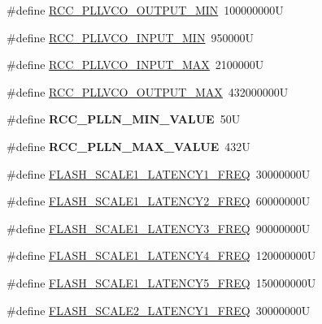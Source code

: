 \begin{DoxyCompactItemize}
\item 
\#define \mbox{\hyperlink{group___exported__macros_ga85746dffdc6d015f5142d7e16489ca84}{R\+C\+C\+\_\+\+P\+L\+L\+V\+C\+O\+\_\+\+O\+U\+T\+P\+U\+T\+\_\+\+M\+IN}}~100000000U
\item 
\#define \mbox{\hyperlink{group___exported__macros_ga288d68c2604cea8548eccdef3873923f}{R\+C\+C\+\_\+\+P\+L\+L\+V\+C\+O\+\_\+\+I\+N\+P\+U\+T\+\_\+\+M\+IN}}~950000U
\item 
\#define \mbox{\hyperlink{group___exported__macros_gad3fd37dbfa74739a3c698ab4755fa27e}{R\+C\+C\+\_\+\+P\+L\+L\+V\+C\+O\+\_\+\+I\+N\+P\+U\+T\+\_\+\+M\+AX}}~2100000U
\item 
\#define \mbox{\hyperlink{group___exported__macros_gaba6ddae0375763847f8dc3e91173d714}{R\+C\+C\+\_\+\+P\+L\+L\+V\+C\+O\+\_\+\+O\+U\+T\+P\+U\+T\+\_\+\+M\+AX}}~432000000U
\item 
\mbox{\label{group___exported__macros_ga6015e60e123ddde47bb3ddfab170c5a1}} 
\#define {\bfseries R\+C\+C\+\_\+\+P\+L\+L\+N\+\_\+\+M\+I\+N\+\_\+\+V\+A\+L\+UE}~50U
\item 
\mbox{\label{group___exported__macros_ga9d6c2fd92a420bb80caf8ca2cadb6a62}} 
\#define {\bfseries R\+C\+C\+\_\+\+P\+L\+L\+N\+\_\+\+M\+A\+X\+\_\+\+V\+A\+L\+UE}~432U
\item 
\#define \mbox{\hyperlink{group___exported__macros_ga980965268c210a75ca5bb1e6b59b4052}{F\+L\+A\+S\+H\+\_\+\+S\+C\+A\+L\+E1\+\_\+\+L\+A\+T\+E\+N\+C\+Y1\+\_\+\+F\+R\+EQ}}~30000000U
\item 
\#define \mbox{\hyperlink{group___exported__macros_ga53673600707f291baa71c30919f8da98}{F\+L\+A\+S\+H\+\_\+\+S\+C\+A\+L\+E1\+\_\+\+L\+A\+T\+E\+N\+C\+Y2\+\_\+\+F\+R\+EQ}}~60000000U
\item 
\#define \mbox{\hyperlink{group___exported__macros_ga547cb8d59cf6a2a73a0f76331e4492df}{F\+L\+A\+S\+H\+\_\+\+S\+C\+A\+L\+E1\+\_\+\+L\+A\+T\+E\+N\+C\+Y3\+\_\+\+F\+R\+EQ}}~90000000U
\item 
\#define \mbox{\hyperlink{group___exported__macros_ga600fe88d1dfa0faef16947e24f52e84e}{F\+L\+A\+S\+H\+\_\+\+S\+C\+A\+L\+E1\+\_\+\+L\+A\+T\+E\+N\+C\+Y4\+\_\+\+F\+R\+EQ}}~120000000U
\item 
\#define \mbox{\hyperlink{group___exported__macros_gaf576f3543b7909cf6c889e05829d37a0}{F\+L\+A\+S\+H\+\_\+\+S\+C\+A\+L\+E1\+\_\+\+L\+A\+T\+E\+N\+C\+Y5\+\_\+\+F\+R\+EQ}}~150000000U
\item 
\#define \mbox{\hyperlink{group___exported__macros_ga19ba80e0c72cd041274f831901f302f9}{F\+L\+A\+S\+H\+\_\+\+S\+C\+A\+L\+E2\+\_\+\+L\+A\+T\+E\+N\+C\+Y1\+\_\+\+F\+R\+EQ}}~30000000U

\end{DoxyCompactItemize}
